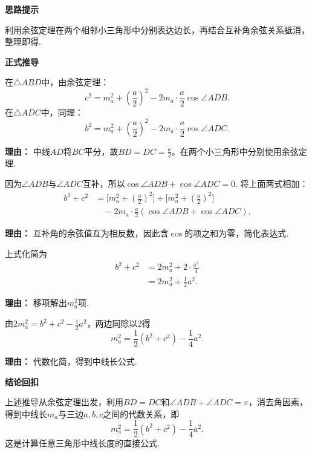 \begin{proofbox}
	\textbf{\textcolor{CProof}{思路提示}}

	利用余弦定理在两个相邻小三角形中分别表达边长，再结合互补角余弦关系抵消，整理即得.

	\medskip
	\textbf{\textcolor{CProof}{正式推导}}
	\begin{description}[style=nextline, leftmargin=2.8em, labelsep=0.5em, itemsep=0.55em]
		\item[\textbf{步骤一（两次余弦定理）：}]
			在$\triangle ABD$中，由余弦定理：
			\[
				c^2 = m_a^2 + \left(\frac{a}{2}\right)^2 - 2 m_a\cdot\frac{a}{2}\cos\angle ADB.
			\]
			在$\triangle ADC$中，同理：
			\[
				b^2 = m_a^2 + \left(\frac{a}{2}\right)^2 - 2 m_a\cdot\frac{a}{2}\cos\angle ADC.
			\]
			\par\textbf{理由：}
			中线$AD$将$BC$平分，故$BD = DC = \frac{a}{2}$。在两个小三角形中分别使用余弦定理.

		\item[\textbf{步骤二（互补角抵消）：}]
			因为$\angle ADB$与$\angle ADC$互补，所以$\cos\angle ADB + \cos\angle ADC = 0$. 将上面两式相加：
			\[
				\begin{aligned}
					b^2 + c^2 &= \bigl[m_a^2 + \left(\frac{a}{2}\right)^2\bigr] + \bigl[m_a^2 + \left(\frac{a}{2}\right)^2\bigr] \\
					&\quad - 2 m_a\cdot\frac{a}{2}(\cos\angle ADB + \cos\angle ADC).
			\end{aligned}
			\]
			\par\textbf{理由：}
			互补角的余弦值互为相反数，因此含$\cos$的项之和为零，简化表达式.

		\item[\textbf{步骤三（合并整理）：}]
			上式化简为
			\[
				\begin{aligned}
					b^2 + c^2 &= 2m_a^2 + 2\cdot\frac{a^2}{4} \\
					&= 2m_a^2 + \frac12 a^2.
			\end{aligned}
			\]
			\par\textbf{理由：}
			移项解出$m_a^2$项.

		\item[\textbf{步骤四（解出中线长）：}]
			由$2m_a^2 = b^2 + c^2 - \frac12 a^2$，两边同除以$2$得
			\[
				m_a^2 = \frac12(b^2+c^2) - \frac14 a^2.
			\]
			\par\textbf{理由：}
			代数化简，得到中线长公式.
	\end{description}

	\medskip
	\textbf{\textcolor{CProof}{结论回扣}}

	上述推导从余弦定理出发，利用$BD = DC$和$\angle ADB + \angle ADC = \pi$，消去角因素，得到中线长$m_a$与三边$a,b,c$之间的代数关系，即
	\[
		m_a^2 = \frac12(b^2+c^2) - \frac14 a^2.
	\]
	这是计算任意三角形中线长度的直接公式.
\end{proofbox}

